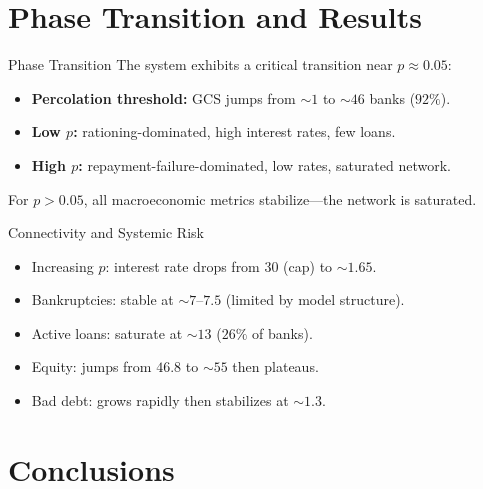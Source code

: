 \section{Phase Transition and Results}\label{sec:7}

\begin{frame}{Phase Transition}
  The system exhibits a critical transition near \textbf{$p \approx 0.05$}:
  \begin{itemize}
    \item \textbf{Percolation threshold:} GCS jumps from $\sim 1$ to $\sim 46$ banks ($92\%$).
    \item \textbf{Low $p$:} rationing-dominated, high interest rates, few loans.
    \item \textbf{High $p$:} repayment-failure-dominated, low rates, saturated network.
  \end{itemize}
  \vspace{0.3cm}
  For $p > 0.05$, all macroeconomic metrics stabilize---the network is saturated.
\end{frame}

\begin{frame}{Connectivity and Systemic Risk}
  \begin{itemize}
    \item Increasing $p$: interest rate drops from $30$ (cap) to $\sim 1.65$.
    \item Bankruptcies: stable at $\sim 7$--$7.5$ (limited by model structure).
    \item Active loans: saturate at $\sim 13$ ($26\%$ of banks).
    \item Equity: jumps from $46.8$ to $\sim 55$ then plateaus.
    \item Bad debt: grows rapidly then stabilizes at $\sim 1.3$.
  \end{itemize}
\end{frame}

\section{Conclusions}\label{sec:8}

